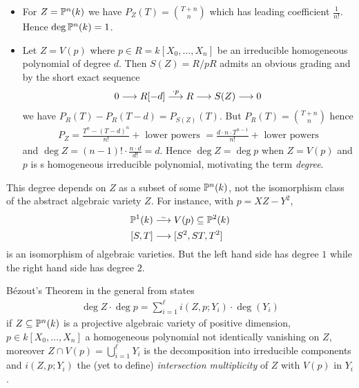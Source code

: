 \documentclass[a4paper,parskip=half,numbers=enddot, DIV=12]{scrreprt}
\begin{document}
\begin{example}
    \begin{itemize}
      \item 
        For $Z=\mathbb{P}^n(k)$ we have $P_Z(T) = \binom{T+n}n$ which has leading coefficient $\frac{1}{n!}$. Hence $\deg \mathbb{P}^n(k) = 1$.
    \item 
        Let $Z= V(p)$ where $p\in R = k[X_0,\ldots, X_n]$ be an irreducible homogeneous polynomial of degree $d$. Then $S(Z) = R/pR$ admits an obvious grading and by the short exact sequence
        \begin{align*}
            0\morphism R[-d]\morphism[\cdot p] R\morphism S (Z) \morphism 0
        \end{align*}
        we have $P_R(T) - P_R(T-d) = P_{S(Z)}(T)$. But $P_R(T) = \binom{T+n}n$ hence 
        \begin{align*}
        	P_Z = \frac{T^n-(T-d)^n}{n!} + \text{ lower powers } = \frac{d\cdot n\cdot T^{n-1}}{n!} + \text{ lower powers} 
        \end{align*}
        and $\deg Z = (n-1)! \cdot\frac{n\cdot d}{d!} = d$. Hence $\deg Z = \deg p$ when $Z=V(p)$ and $p$ is s homogeneous irreducible polynomial, motivating the term \emph{degree}.
    \end{itemize}
\end{example}
\begin{rem*}
    This degree depends on $Z$ as a subset of some $\mathbb{P}^n(k)$, not the isomorphism class of the abstract algebraic variety $Z$. For instance, with $p= XZ-Y^2$,
    \begin{align*}
        \IP^1(k) &\isomorphism  V(p) \subseteq \IP^2(k)\\
        [S,T] &\morphism[] [S^2, ST, T^2]
    \end{align*}
    is an isomorphism of algebraic varieties. But the left hand side has degree $1$ while the right hand side has degree $2$.
\end{rem*}
\begin{rem*}
    B\'ezout's Theorem in the general from states 
    \begin{align*}
    	\deg Z\cdot \deg p = \sum_{i=1}^\ell i(Z,p; Y_i) \cdot \deg(Y_i)
    \end{align*}
     if $Z\subseteq \mathbb{P}^n(k)$ is a projective algebraic variety of positive dimension, $p\in k[X_0,\ldots, X_n]$ a homogeneous polynomial not identically vanishing on $Z$, moreover $Z\cap V(p) = \bigcup_{i=1}^\ell Y_i$ is the decomposition into irreducible components and $i(Z,p;Y_i)$ the (yet to define) \emph{intersection multiplicity} of $Z$ with $V(p)$ in $Y_i$.
\end{rem*}
\end{document}
